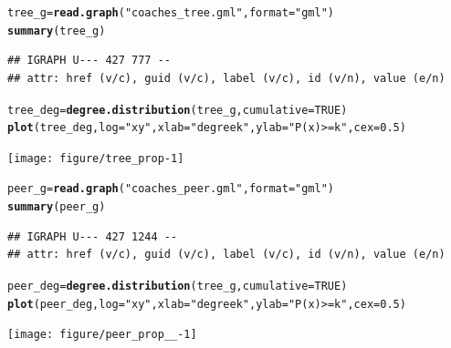 \documentclass[11pt]{article}\usepackage[]{graphicx}\usepackage[]{color}
\makeatletter
\newcommand{\hlnum}[1]{\textcolor[rgb]{0.686,0.059,0.569}{#1}}%
\newcommand{\hlstr}[1]{\textcolor[rgb]{0.192,0.494,0.8}{#1}}%
\newcommand{\hlstd}[1]{\textcolor[rgb]{0.345,0.345,0.345}{#1}}%
\newcommand{\hlkwb}[1]{\textcolor[rgb]{0.69,0.353,0.396}{#1}}%
\newcommand{\hlkwc}[1]{\textcolor[rgb]{0.333,0.667,0.333}{#1}}%
\newcommand{\hlkwd}[1]{\textcolor[rgb]{0.737,0.353,0.396}{\textbf{#1}}}%
\newenvironment{kframe}{%
 \def\at@end@of@kframe{}%
 \ifinner\ifhmode%
  \def\at@end@of@kframe{\end{minipage}}%
  \begin{minipage}{\columnwidth}%
 \fi\fi%
 \def\FrameCommand##1{\hskip\@totalleftmargin \hskip-\fboxsep
 \colorbox{shadecolor}{##1}\hskip-\fboxsep
     \hskip-\linewidth \hskip-\@totalleftmargin \hskip\columnwidth}%
 \MakeFramed {\advance\hsize-\width
   \@totalleftmargin\z@ \linewidth\hsize
   \@setminipage}}%
 {\par\unskip\endMakeFramed%
 \at@end@of@kframe}
\newenvironment{knitrout}{}{} %
\makeatother
\begin{document}
\begin{knitrout}
\color{fgcolor}\begin{kframe}
\begin{alltt}
\hlstd{tree_g} \hlkwb{=} \hlkwd{read.graph}\hlstd{(}\hlstr{"coaches_tree.gml"}\hlstd{,}\hlkwc{format}\hlstd{=}\hlstr{"gml"}\hlstd{)}
\hlkwd{summary}\hlstd{(tree_g)}
\end{alltt}
\begin{verbatim}
## IGRAPH U--- 427 777 -- 
## attr: href (v/c), guid (v/c), label (v/c), id (v/n), value (e/n)
\end{verbatim}
\begin{alltt}
\hlstd{tree_deg} \hlkwb{=} \hlkwd{degree.distribution}\hlstd{(tree_g,} \hlkwc{cumulative} \hlstd{=} \hlnum{TRUE}\hlstd{)}
\hlkwd{plot}\hlstd{(tree_deg,}\hlkwc{log}\hlstd{=}\hlstr{"xy"}\hlstd{,}\hlkwc{xlab}\hlstd{=}\hlstr{"degree k"}\hlstd{,}\hlkwc{ylab}\hlstd{=}\hlstr{"P(x) >= k"}\hlstd{,}\hlkwc{cex}\hlstd{=}\hlnum{0.5}\hlstd{)}
\end{alltt}
\end{kframe}

{\centering \texttt{[image: figure/tree\_prop-1]} 

}



\end{knitrout}

\begin{knitrout}
\color{fgcolor}\begin{kframe}
\begin{alltt}
\hlstd{peer_g} \hlkwb{=} \hlkwd{read.graph}\hlstd{(}\hlstr{"coaches_peer.gml"}\hlstd{,}\hlkwc{format}\hlstd{=}\hlstr{"gml"}\hlstd{)}
\hlkwd{summary}\hlstd{(peer_g)}
\end{alltt}
\begin{verbatim}
## IGRAPH U--- 427 1244 -- 
## attr: href (v/c), guid (v/c), label (v/c), id (v/n), value (e/n)
\end{verbatim}
\begin{alltt}
\hlstd{peer_deg} \hlkwb{=} \hlkwd{degree.distribution}\hlstd{(tree_g,} \hlkwc{cumulative} \hlstd{=} \hlnum{TRUE}\hlstd{)}
\hlkwd{plot}\hlstd{(peer_deg,}\hlkwc{log}\hlstd{=}\hlstr{"xy"}\hlstd{,}\hlkwc{xlab}\hlstd{=}\hlstr{"degree k"}\hlstd{,}\hlkwc{ylab}\hlstd{=}\hlstr{"P(x) >= k"}\hlstd{,}\hlkwc{cex}\hlstd{=}\hlnum{0.5}\hlstd{)}
\end{alltt}
\end{kframe}

{\centering \texttt{[image: figure/peer\_prop\_\_-1]} 

}



\end{knitrout}
\end{document}

